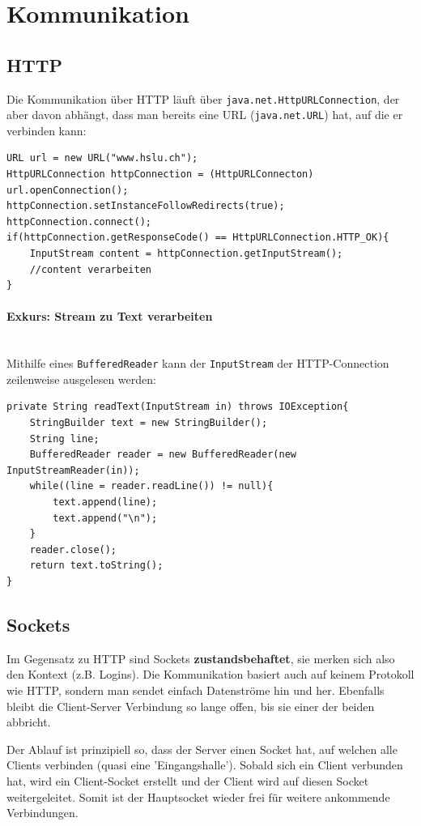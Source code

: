 \documentclass[a4paper, 11pt]{article}
\newcommand{\code}[1]{\texttt{#1}}
\begin{document}
\section{Kommunikation}
\subsection{HTTP}
Die Kommunikation über HTTP läuft über \code{java.net.HttpURLConnection}, der aber davon abhängt, dass man bereits eine URL (\code{java.net.URL}) hat, auf die er verbinden kann:

\begin{lstlisting}[caption={}]
URL url = new URL("www.hslu.ch");
HttpURLConnection httpConnection = (HttpURLConnecton) url.openConnection();
httpConnection.setInstanceFollowRedirects(true);
httpConnection.connect();
if(httpConnection.getResponseCode() == HttpURLConnection.HTTP_OK){
	InputStream content = httpConnection.getInputStream();
	//content verarbeiten
}
\end{lstlisting}

\paragraph{Exkurs: Stream zu Text verarbeiten}\mbox{}\\
Mithilfe eines \code{BufferedReader} kann der \code{InputStream} der HTTP-Connection zeilenweise ausgelesen werden:

\begin{lstlisting}[caption={}]
private String readText(InputStream in) throws IOException{
	StringBuilder text = new StringBuilder();
	String line;
	BufferedReader reader = new BufferedReader(new InputStreamReader(in));
	while((line = reader.readLine()) != null){
		text.append(line);
		text.append("\n");
	}
	reader.close();
	return text.toString();
}
\end{lstlisting}

\subsection{Sockets}
Im Gegensatz zu HTTP sind Sockets \textbf{zustandsbehaftet}, sie merken sich also den Kontext (z.B. Logins). Die Kommunikation basiert auch auf keinem Protokoll wie HTTP, sondern man sendet einfach Datenströme hin und her. Ebenfalls bleibt die Client-Server Verbindung so lange offen, bis sie einer der beiden abbricht.
\vspace{10px}

\noindent Der Ablauf ist prinzipiell so, dass der Server einen Socket hat, auf welchen alle Clients verbinden (quasi eine 'Eingangshalle'). Sobald sich ein Client verbunden hat, wird ein Client-Socket erstellt und der Client wird auf diesen Socket weitergeleitet. Somit ist der Hauptsocket wieder frei für weitere ankommende Verbindungen. 
\vspace{10px}
\end{document}
